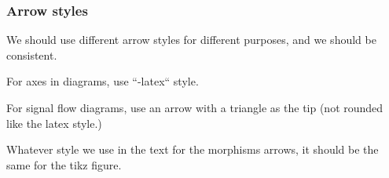 \subsubsection*{Arrow styles}

We should use different arrow styles for different purposes,
and we should be consistent.

For axes in diagrams, use ``-latex`` style.

For signal flow diagrams, use an arrow with a triangle as the tip (not rounded like the latex style.)

Whatever style we use in the text for the morphisms arrows, it should be the
same for the tikz figure.






